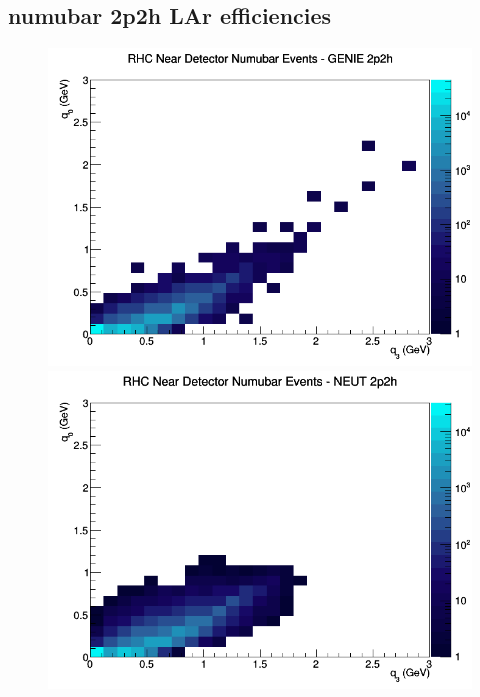 \subsection{numubar 2p2h LAr efficiencies}
\begin{figure}[h]
\includegraphics[width=\linewidth]{eff_q0_q3/LAr/2p2h_RHC_ND_numubar_q3_q0_GENIE.png}
\endminipage
{}
\includegraphics[width=\linewidth]{eff_q0_q3/LAr/2p2h_RHC_ND_numubar_q3_q0_NEUT.png}
\endminipage
{}

\end{figure}
